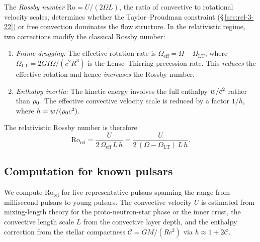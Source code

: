 The \emph{Rossby number} $\mathrm{Ro} = U/(2\Omega L)$, the ratio
of convective to rotational velocity scales, determines whether the
Taylor--Proudman constraint (\S\,\ref{sec:rel-3-22}) or free
convection dominates the flow structure.  In the relativistic
regime, two corrections modify the classical Rossby number:
\begin{enumerate}
\item \emph{Frame dragging:}  The effective rotation rate is
  $\Omega_{\mathrm{eff}} = \Omega - \Omega_{\mathrm{LT}}$, where
  $\Omega_{\mathrm{LT}} = 2GI\Omega/(c^2 R^3)$ is the
  Lense--Thirring precession rate.  This \emph{reduces} the effective
  rotation and hence \emph{increases} the Rossby number.
\item \emph{Enthalpy inertia:}  The kinetic energy involves the full
  enthalpy $w/c^2$ rather than $\rho_0$.  The effective
  convective velocity scale is reduced by a factor $1/h$, where
  $h = w/(\rho_0 c^2)$.
\end{enumerate}
The relativistic Rossby number is therefore
\begin{equation}
\label{eq:rel-Ro-def}
\boxed{
\mathrm{Ro}_{\mathrm{rel}}
= \frac{U}{2\,\Omega_{\mathrm{eff}}\,L\,h}
= \frac{U}{2\,(\Omega - \Omega_{\mathrm{LT}})\,L\,h}.
}
\end{equation}

\subsection{Computation for known pulsars}

We compute $\mathrm{Ro}_{\mathrm{rel}}$ for five representative
pulsars spanning the range from millisecond pulsars to young
pulsars.  The convective velocity $U$ is estimated from
mixing-length theory for the proto-neutron-star phase or the
inner crust, the convective length scale $L$ from the convective
layer depth, and the enthalpy correction from the stellar
compactness $\mathcal{C} = GM/(Rc^2)$ via $h \approx 1 + 2\mathcal{C}$.

